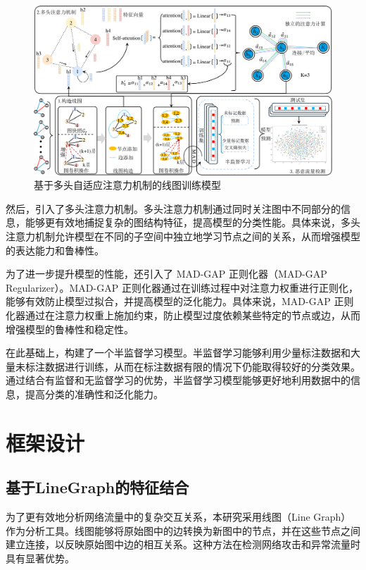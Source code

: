 \documentclass[promaster]{thesis-uestc}
\begin{document}
\begin{figure}[h!]
    \centering
    \includegraphics[width=1\linewidth]{./pic/线图+多头注意力(大字版).pdf}
    \caption{基于多头自适应注意力机制的线图训练模型}
    \label{lineAndAttention}
\end{figure}

然后，引入了多头注意力机制。多头注意力机制通过同时关注图中不同部分的信息，能够更有效地捕捉复杂的图结构特征，提高模型的分类性能。具体来说，多头注意力机制允许模型在不同的子空间中独立地学习节点之间的关系，从而增强模型的表达能力和鲁棒性。

为了进一步提升模型的性能，还引入了 MAD-GAP 正则化器（MAD-GAP Regularizer）。MAD-GAP 正则化器通过在训练过程中对注意力权重进行正则化，能够有效防止模型过拟合，并提高模型的泛化能力。具体来说，MAD-GAP 正则化器通过在注意力权重上施加约束，防止模型过度依赖某些特定的节点或边，从而增强模型的鲁棒性和稳定性。

在此基础上，构建了一个半监督学习模型。半监督学习能够利用少量标注数据和大量未标注数据进行训练，从而在标注数据有限的情况下仍能取得较好的分类效果。通过结合有监督和无监督学习的优势，半监督学习模型能够更好地利用数据中的信息，提高分类的准确性和泛化能力。

\section{框架设计}
\subsection{基于LineGraph的特征结合 }
为了更有效地分析网络流量中的复杂交互关系，本研究采用线图（Line Graph）作为分析工具。线图能够将原始图中的边转换为新图中的节点，并在这些节点之间建立连接，以反映原始图中边的相互关系。这种方法在检测网络攻击和异常流量时具有显著优势。
\end{document}
